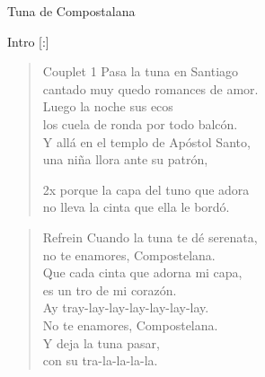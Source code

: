 \begin{song}{Tuna de Compostalana}
\small
\begin{instrumental}{Intro}
[:]
\end{instrumental}

\begin{verse}{Couplet 1}
\hspace{4em}Pasa la tuna en Santiago\\
cantado muy quedo romances de amor.\\
\hspace{4em}Luego la noche sus ecos\\
los cuela de ronda por todo balcón.\\
Y allá en el templo de Apóstol Santo,\\
una niña llora ante su patrón,\\
\begin{sidenote}{2x}
porque la capa del tuno que adora\\
no lleva la cinta que ella le bordó. 
\end{sidenote}
\end{verse}

\begin{verse}{Refrein}
Cuando la tuna te dé serenata,\\
no te enamores, Compostelana.\\
Que cada cinta que adorna mi capa,\chord{}\\
es un tro de mi corazón.\hspace{1em}\\
Ay tray-lay-lay-lay-lay-lay-lay.\\
No te enamores, Compostelana. \\
Y deja la tuna pasar,\\
con su tra-la-la-la-la.\\
\end{verse}


\end{song}
